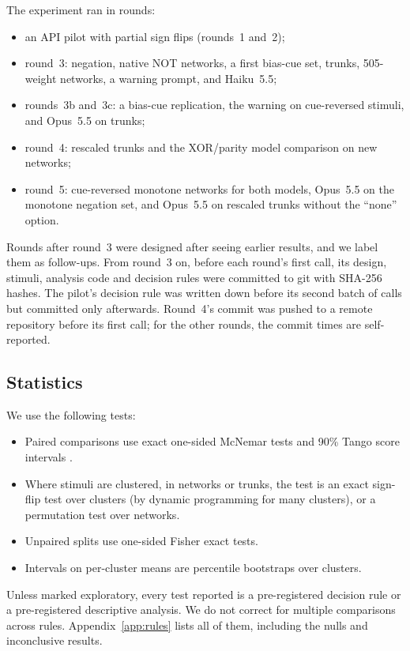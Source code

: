 \documentclass[10pt]{article}
\newcommand{\Opus}{Opus~5.5}
\newcommand{\Haiku}{Haiku~5.5}
\begin{document}
The experiment ran in rounds:
\begin{itemize}
\item an API pilot with partial sign flips (rounds~1 and~2);
\item round~3: negation, native NOT networks, a first bias-cue set, trunks, 505-weight networks, a warning prompt, and \Haiku{};
\item rounds~3b and~3c: a bias-cue replication, the warning on cue-reversed stimuli, and \Opus{} on trunks;
\item round~4: rescaled trunks and the XOR/parity model comparison on new networks;
\item round~5: cue-reversed monotone networks for both models, \Opus{} on the monotone negation set, and \Opus{} on rescaled trunks without the ``none'' option.
\end{itemize}
Rounds after round~3 were designed after seeing earlier results, and we label them as follow-ups. From round~3 on, before each round's first call, its design, stimuli, analysis code and decision rules were committed to git with SHA-256 hashes. The pilot's decision rule was written down before its second batch of calls but committed only afterwards. Round~4's commit was pushed to a remote repository before its first call; for the other rounds, the commit times are self-reported.

\subsection{Statistics}
We use the following tests:
\begin{itemize}
\item Paired comparisons use exact one-sided McNemar tests \citep{mcnemar1947} and 90\% Tango score intervals \citep{tango1998}.
\item Where stimuli are clustered, in networks or trunks, the test is an exact sign-flip test over clusters (by dynamic programming for many clusters), or a permutation test over networks.
\item Unpaired splits use one-sided Fisher exact tests.
\item Intervals on per-cluster means are percentile bootstraps over clusters.
\end{itemize}
Unless marked exploratory, every test reported is a pre-registered decision rule or a pre-registered descriptive analysis. We do not correct for multiple comparisons across rules. Appendix~\ref{app:rules} lists all of them, including the nulls and inconclusive results.
\end{document}
